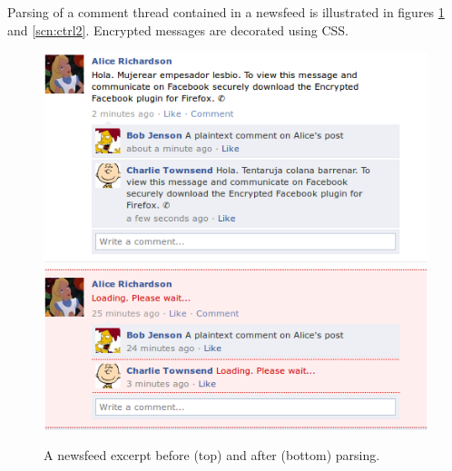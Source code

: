Parsing of a comment thread contained in a newsfeed is illustrated in figures \ref{scn:ctrl} and \ref{scn:ctrl2}. Encrypted messages are decorated using CSS.

    \begin{figure}[tbph]
        \begin{center}
                \includegraphics[width=12cm]{screens/content1.png}
                \includegraphics[width=12cm]{screens/content4.png}
            \caption{A newsfeed excerpt before (top) and after (bottom) parsing.}
            \label{scn:ctrl}
        \end{center}
    \end{figure}
    
